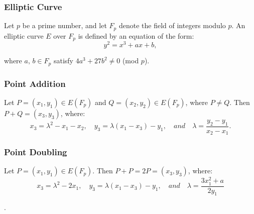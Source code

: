\documentclass[12pt,a4paper]{article}
\begin{document}
\subsubsection{Elliptic Curve}\noindent \label{Elliptic Curve}
Let $p$ be a prime number, and let $F_p$ denote the field of integers modulo $p$. 
An elliptic curve $E$ over $F_p$ is defined by an equation of the form:
\begin{equation}
y^2 = x^3 + ax + b,
\end{equation}

where $a,\, b \in F_p$ satisfy $4a^3 + 27b^2 \ne 0$ (mod $ p$).

\subsubsection{Point Addition}\noindent \label{Point Addition}
Let $P = (x_1,y_1) \in E(F_p)$ and $Q = (x_2,y_2) \in E(F_p)$, where $P \neq Q$. 
Then $P + Q = (x_3,y_3)$, where:
\begin{equation}
    x_3 = \lambda^2 - x_1 - x_2, \quad y_3 = \lambda(x_1 - x_3) - y_1, \quad and \quad \lambda = \frac{y_2-y_1}{x_2-x_1}.
\end{equation}

\subsubsection{Point Doubling}\noindent \label{Point Doubling}
Let $P = (x_1,y_1) \in E(F_p)$. 
Then $P + P = 2P = (x_3,y_3)$, where:
\begin{equation}
    x_3 = \lambda^2 - 2x_1, \quad y_3 = \lambda(x_1 - x_3) - y_1, \quad and \quad \lambda = \frac{3x_1^2 + a}{2y_1}
\end{equation}

\cite{hankerson2003guide,lopez2000overview}.

\vspace{5mm}
\end{document}
